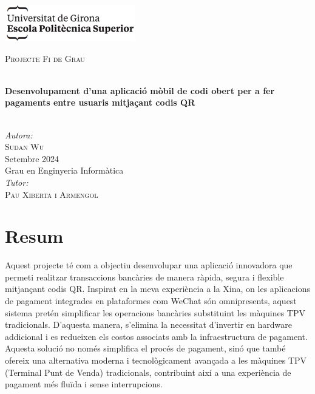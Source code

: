 \documentclass[a4paper,12pt,twoside]{ThesisStyle}
\begin{document}
\begin{titlepage}

\includegraphics[scale=0.9]{imatges/logo_eps.png} \\[1cm]
\begin{center}
\textsc{\Large Projecte Fi de Grau} \\[1cm]

\begin{spacing}{2}
\HRule \\
\textbf{\Huge Desenvolupament d'una aplicació mòbil de codi obert per a fer pagaments entre usuaris mitjaçant codis QR} \\
\HRule \\[0.5cm]
\end{spacing}

{
\large
\emph{Autora:} \\
\textsc{Sudan Wu} \\[1cm]
Setembre 2024 \\[1cm]
Grau en Enginyeria Informàtica \\[1cm]
\emph{Tutor:} \\
\textsc{Pau Xiberta i Armengol} \\
}

\end{center}
\end{titlepage}

\titlepage

\dominitoc


\chapter*{Resum}
\label{chp:resum}


Aquest projecte té com a objectiu desenvolupar una aplicació innovadora que permeti realitzar transaccions bancàries de manera ràpida, segura i flexible mitjançant codis QR. Inspirat en la meva experiència a la Xina, on les aplicacions de pagament integrades en plataformes com WeChat són omnipresents, aquest sistema pretén simplificar les operacions bancàries substituint les màquines TPV tradicionals. D'aquesta manera, s'elimina la necessitat d'invertir en hardware addicional i es redueixen els costos associats amb la infraestructura de pagament. Aquesta solució no només simplifica el procés de pagament, sinó que també ofereix una alternativa moderna i tecnològicament avançada a les màquines TPV (Terminal Punt de Venda) tradicionals, contribuint així a una experiència de pagament més fluïda i sense interrupcions.\\
\end{document}
